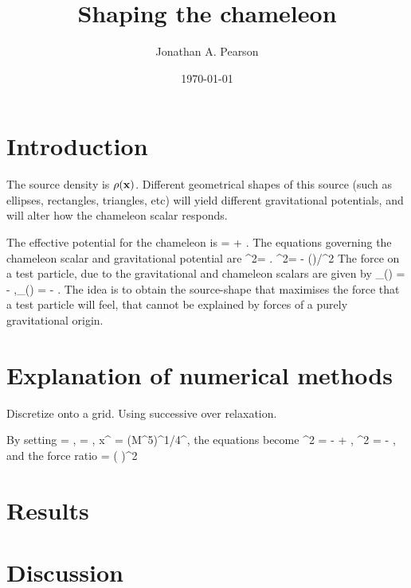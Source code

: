 \documentclass[amsmath,amssymb,10pt,eqsecnum, twocolumn]{revtex4}
\begin{document}
\title{Shaping the chameleon}
\author{Jonathan A. Pearson}
\date{\today}

\maketitle




 
 
 
\section{Introduction}

The source density is $\rho({\bf{x}})$.  Different geometrical shapes of this source (such as ellipses, rectangles, triangles, etc) will yield different gravitational potentials, and will alter how the chameleon scalar responds.

The effective potential for the chameleon is
\bea
{} =  + \phi.
\eea
The equations governing the chameleon scalar and gravitational potential are
\bse
\bea
\nabla^2\phi = .
\eea
\bea
\nabla^2\Phi = - \rho()/^2
\eea
\ese
The force on a test particle, due to the gravitational and chameleon scalars are given by
\bea
{}_{(\phi)} = - \nabla\phi,\qquad {}_{(\Phi)} = - \nabla\Phi.
\eea
The idea is to obtain the source-shape that maximises the force that a test particle will feel, that cannot be explained by forces of a purely gravitational origin.


\section{Explanation of numerical methods}
Discretize onto a grid. Using successive over relaxation.

By setting
\bea
\phi = \tilde{\phi},
\eea
\bea
\Phi = \tilde{\Phi},
\eea
\bea
x^{\mu} = \left(M\Lambda^5\right)^{1/4}^{\mu},
\eea
the equations become
\bea
\tilde{\nabla}^2\tilde{\phi} = -  + \rho,
\eea
\bea
\tilde{\nabla}^2\tilde{\Phi} = - \half \rho,
\eea
and the force ratio
\bea
{} = \left( \right)^2\frac{\left| \tilde{\nabla}\tilde{\phi}\right|}{\left| \tilde{\nabla}\tilde{\Phi}\right|}
\eea
\section{Results}

\section{Discussion}
\end{document}

